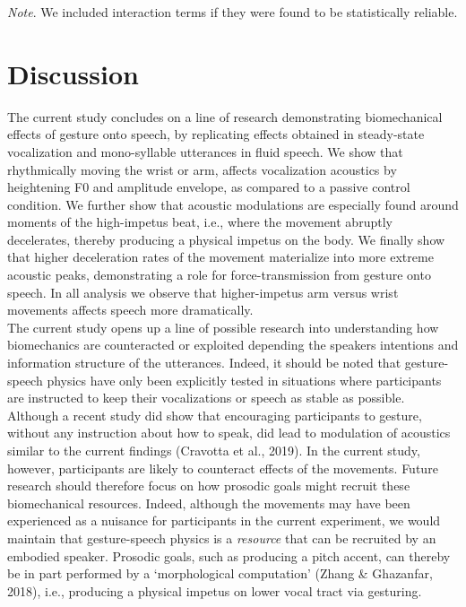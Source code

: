 \documentclass[
  man, noextraspace,floatsintext]{apa6}
\begin{document}
\emph{Note}. We included interaction terms if they were found to be statistically reliable.

\pagebreak

\hypertarget{discussion}{%
\section{Discussion}\label{discussion}}

The current study concludes on a line of research demonstrating biomechanical effects of gesture onto speech, by replicating effects obtained in steady-state vocalization and mono-syllable utterances in fluid speech. We show that rhythmically moving the wrist or arm, affects vocalization acoustics by heightening F0 and amplitude envelope, as compared to a passive control condition. We further show that acoustic modulations are especially found around moments of the high-impetus beat, i.e., where the movement abruptly decelerates, thereby producing a physical impetus on the body. We finally show that higher deceleration rates of the movement materialize into more extreme acoustic peaks, demonstrating a role for force-transmission from gesture onto speech. In all analysis we observe that higher-impetus arm versus wrist movements affects speech more dramatically.\\
The current study opens up a line of possible research into understanding how biomechanics are counteracted or exploited depending the speakers intentions and information structure of the utterances. Indeed, it should be noted that gesture-speech physics have only been explicitly tested in situations where participants are instructed to keep their vocalizations or speech as stable as possible. Although a recent study did show that encouraging participants to gesture, without any instruction about how to speak, did lead to modulation of acoustics similar to the current findings (Cravotta et al., 2019). In the current study, however, participants are likely to counteract effects of the movements. Future research should therefore focus on how prosodic goals might recruit these biomechanical resources. Indeed, although the movements may have been experienced as a nuisance for participants in the current experiment, we would maintain that gesture-speech physics is a \emph{resource} that can be recruited by an embodied speaker. Prosodic goals, such as producing a pitch accent, can thereby be in part performed by a `morphological computation' (Zhang \& Ghazanfar, 2018), i.e., producing a physical impetus on lower vocal tract via gesturing.\\
\end{document}
